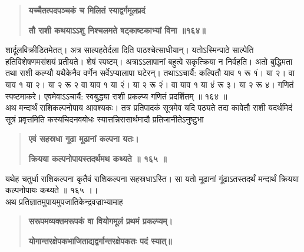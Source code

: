 \documentclass[11pt, openany]{book}
\begin{document}
\begin{sloppypar}
\begin{quote}
\hspace{0.5in}\textbf{यच्चैतत्पदपञ्चकं च मिलितं स्याद्वर्गमूलप्रदं}

\hspace{0.5in}\textbf{तौ राशी कथयाऽऽशु निश्चलमते षट्काष्टकाभ्यां विना ॥१६४॥}
\end{quote}

\hangindent=0.2in \hspace{0.2in}शार्दूलविक्रीडितमेतत्। अत्र साल्पहतेर्दला दिति पाठश्चेत्साधीयान्। यतोऽस्मिन्पाठे साल्पेति हतिविशेषणमसंशयं प्रतीयते। शेषं स्पष्टम्। अत्राऽऽलापानां बहुत्वे सकृत्क्रिया न निर्वहति। अतो बुद्धिमता तथा राशी कल्प्यौ यथैकेनैव वर्णेन सर्वेऽप्यालापा घटेरन्। तथाऽऽचार्यै: कल्पितौ याव १ रू १ं। या २। वा याव १ या २। या २ रू २ \textbar वा याव १ या २ं। या २ रू २ं। वा याव १ या ४ं रू ३। या २ रू ४। गणितं स्पष्टमाकरे। एवमेवाऽऽचार्यै: स्वबुद्ध्या राशी प्रकल्प्य गणितं प्रदर्शितम् ॥ १६४ ॥\\

\hangindent=0.2in \hspace{0.2in}अथ मन्दार्थं राशिकल्पनोपाय आवश्यकः। तत्र प्रतिपादकं सूत्रमेव यदि पठ्यते तदा कावेतौ राशी यदर्थमिदं सूत्रं प्रवृत्तमिति कस्यचिदनवबोधः स्यात्तन्निरासार्थमादौ प्रतिजानीतेऽनुष्टुभा\textendash

\begin{quote}
\hspace{1in}\textbf{एवं सहस्रधा गूढा मूढानां कल्पना यतः।}

\hspace{1in}\textbf{क्रियया कल्पनोपायस्तदर्थमथ कथ्यते ॥ १६५ ॥}
\end{quote}

\hangindent=0.2in \hspace{0.2in}यथेह चतुर्धा राशिकल्पना कृतैवं राशिकल्पना सहस्रधाऽस्ति। सा यतो मूढानां गूंढाऽतस्तदर्थं मन्दार्थं क्रियया कल्पनोपायः कथ्यते ॥ १६५ ।।\\

\hangindent=0.2in \hspace{0.2in}अथ प्रतिज्ञातमुपायमुपजातिकेन्द्रवज्राभ्यामाह\textendash

\begin{quote}
\hspace{0.5in}\textbf{सरूपमव्यक्तमरूपकं वा वियोगमूलं प्रथमं प्रकल्प्यम्।}

\hspace{0.5in}\textbf{योगान्तरक्षेपकभाजिताद्यद्वर्गान्तरक्षेपकतः पदं स्यात्॥}


\end{quote}
\end{sloppypar}
\end{document}

